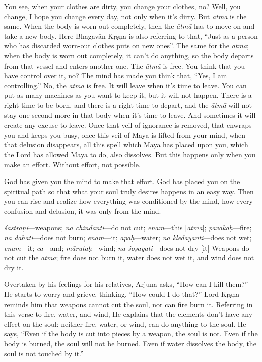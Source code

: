 You see, when your clothes are dirty, you change your clothes, no? Well, you change, I hope you change every day, not only when it’s dirty. But \textit{ātmā} is the same. When the body is worn out completely, then the \textit{ātmā} has to move on and take a new body. Here Bhagavān Kṛṣṇa is also referring to that, “Just as a person who has discarded worn-out clothes puts on new ones”. The same for the \textit{ātmā}; when the body is worn out completely, it can’t do anything, so the body departs from that vessel and enters another one. The \textit{ātmā} is free. You think that you have control over it, no? The mind has made you think that, “Yes, I am controlling.” No, the \textit{ātmā} is free. It will leave when it’s time to leave. You can put as many machines as you want to keep it, but it will not happen. There is a right time to be born, and there is a right time to depart, and the \textit{ātmā} will not stay one second more in that body when it’s time to leave. And sometimes it will create any excuse to leave. Once that veil of ignorance is removed, that enwraps you and keeps you busy, once this veil of Maya is lifted from your mind, when that delusion disappears, all this spell which Maya has placed upon you, which the Lord has allowed Maya to do, also dissolves. But this happens only when you make an effort. Without effort, not possible.

God has given you the mind to make that effort. God has placed you on the spiritual path so that what your soul truly desires happens in an easy way. Then you can rise and realize how everything was conditioned by the mind, how every confusion and delusion, it was only from the mind.

{%
  \textit{śastrāṇi}---weapons; 
  \textit{na chindanti}---do not cut; 
  \textit{enam}---this [\textit{ātmā}]; 
  \textit{pāvakaḥ}---fire; 
  \textit{na dahati}---does not burn; 
  \textit{enam}---it; 
  \textit{āpaḥ}---water; 
  \textit{na kledayanti}---does not wet; 
  \textit{enam}---it; 
  \textit{ca}---and; 
  \textit{mārutaḥ}---wind; 
  \textit{na śoṣayati}---does not dry [it]
}
{%
  Weapons do not cut the \textit{ātmā}; fire does not burn it, water does not wet it, and wind does not dry it.
}

Overtaken by his feelings for his relatives, Arjuna asks, “How can I kill them?” He starts to worry and grieve, thinking, “How could I do that?” Lord Kṛṣṇa reminds him that weapons cannot cut the soul, nor can fire burn it. Referring in this verse to fire, water, and wind, He explains that the elements don’t have any effect on the soul: neither fire, water, or wind, can do anything to the soul. He says, “Even if the body is cut into pieces by a weapon, the soul is not. Even if the body is burned, the soul will not be burned. Even if water dissolves the body, the soul is not touched by it.”

